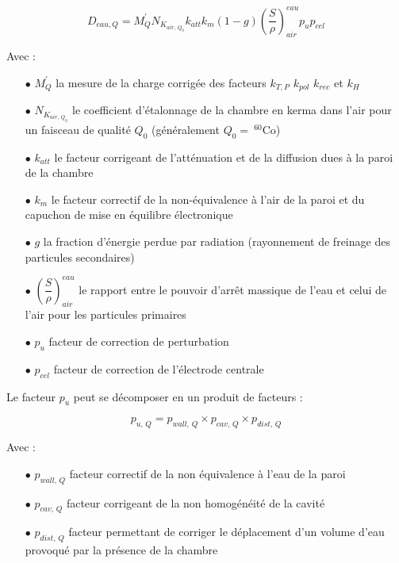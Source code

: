 \documentclass{article}
\begin{document}
\begin{equation}
  D_{eau, Q} = M_Q^{'} N_{K_{air, \, Q_0}} k_{att} k_{m} (1-g) \left(\dfrac{S}{\rho}\right)^{eau}_{air} p_u p_{cel}
  \label{eq_dose_277}
\end{equation}

Avec :

\begin{itemize}
  \item[$\bullet$] $M_{Q}^{'}$ la mesure de la charge corrigée des facteurs $k_{T,P}$ $k_{pol}$ $k_{rec}$ et $k_H$
  \item[$\bullet$] $N_{K_{air, \, Q_0}}$ le coefficient d'étalonnage de la chambre en kerma dans l'air pour un faisceau de qualité $Q_0$ (généralement $Q_0  =\: ^{60}$Co)
  \item[$\bullet$] $k_{att}$ le facteur corrigeant de l'atténuation et de la diffusion dues à la paroi de la chambre
  \item[$\bullet$] $k_m$ le facteur correctif de la non-équivalence à l'air de la paroi et du capuchon de mise en équilibre électronique
  \item[$\bullet$] $g$ la fraction d'énergie perdue par radiation (rayonnement de freinage des particules secondaires)
  \item[$\bullet$] $\left(\dfrac{S}{\rho}\right) ^{eau}_{air}$ le rapport entre le pouvoir d'arrêt massique de l'eau et celui de l'air pour les particules primaires
  \item[$\bullet$] $p_u$ facteur de correction de perturbation
  \item[$\bullet$] $p_{cel}$ facteur de correction de l'électrode centrale
\end{itemize}

Le facteur $p_u$ peut se décomposer en un produit de facteurs :

\begin{equation}
  p_{u,\, Q} = p_{wall,\, Q} \times p_{cav,\, Q} \times p_{dist,\, Q}
  \label{eq_pu}
\end{equation}

Avec :
\begin{itemize}
  \item[$\bullet$] $p_{wall,\, Q}$ facteur correctif de la non équivalence à l'eau de la paroi
  \item[$\bullet$] $p_{cav,\, Q}$ facteur corrigeant de la non homogénéité de la cavité
  \item[$\bullet$] $p_{dist,\, Q}$ facteur permettant de corriger le déplacement d'un volume d'eau provoqué par la présence de la chambre
\end{itemize}
\end{document}
